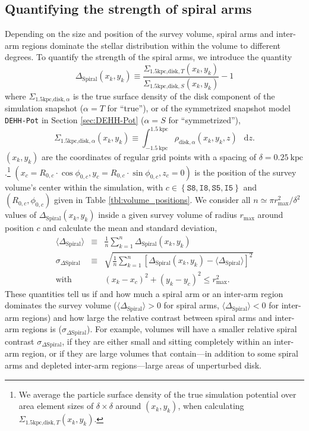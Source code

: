 \documentclass[iop,revtex4,numberedappendix,appendixfloats]{emulateapj}
\newcommand*\diff{\mathop{}\!\mathrm{d}}
\begin{document}
\subsection{Quantifying the strength of spiral arms} \label{sec:spiral_arm_DeltaS}

Depending on the size and position of the survey volume, spiral arms and inter-arm regions dominate the stellar distribution within the volume to different degrees. To quantify the strength of the spiral arms, we introduce the quantity
\begin{equation}
\Delta_\text{Spiral} (x_k,y_k) \equiv \frac{\Sigma_{\text{1.5kpc,disk},T}(x_k,y_k)}{\Sigma_{\text{1.5kpc,disk},S}(x_k,y_k)} -1\label{eq:DeltaS_definition}
\end{equation}
where $\Sigma_{\text{1.5kpc,disk},\alpha}$ is the true surface density of the disk component of the simulation snapshot ($\alpha=T$ for ``true''), or of the symmetrized snapshot model \texttt{DEHH-Pot} in Section \ref{sec:DEHH-Pot} ($\alpha=S$ for ``symmetrized''),
\begin{equation}
\Sigma_{\text{1.5kpc,disk},\alpha}(x_k,y_k) \equiv \int_{-1.5~\text{kpc}}^{1.5~\text{kpc}} \rho_{\text{disk},\alpha}(x_k,y_k,z) \ \diff z.
\end{equation}
$(x_k,y_k)$ are the coordinates of regular grid points with a spacing of $\delta=0.25~\text{kpc}$.\footnote{We average the particle surface density of the true simulation potential over area element sizes of $\delta \times \delta$ around $(x_k,y_k)$, when calculating $\Sigma_{\text{1.5kpc,disk},T}(x_k,y_k)$.} $(x_c=R_{0,c} \cdot \cos \phi_{0,c},y_c=R_{0,c} \cdot \sin \phi_{0,c},z_c=0)$ is the position of the survey volume's center within the simulation, with $c\in\left\{ \texttt{S8},\texttt{I8},\texttt{S5},\texttt{I5}\right\}$ and $(R_{0,c},\phi_{0,c})$ given in Table \ref{tbl:volume_positions}. We consider all $n \simeq \pi r_\text{max}^2/\delta^2$ values of $\Delta_\text{Spiral} (x_k,y_k)$ inside a given survey volume of radius $r_\text{max}$ around position $c$ and calculate the mean and standard deviation,
\begin{eqnarray}
\langle \Delta_\text{Spiral} \rangle &\equiv & \frac 1n \sum_{k=1}^n \Delta_\text{Spiral}(x_k,y_k)\label{eq:mean_DeltaS}\\
\sigma_{\Delta\text{Spiral}} &\equiv & \sqrt{\frac 1n \sum_{k=1}^{n} \left[ \Delta_\text{Spiral}(x_k,y_k) - \langle \Delta_\text{Spiral} \rangle \right]^2}\label{eq:std_DeltaS}\\
 \text{with } && (x_k-x_c)^2 + (y_k-y_c)^2 \leq r_\text{max}^2.
\end{eqnarray}
These quantities tell us if and how much a spiral arm or an inter-arm region dominates the survey volume ($\langle \Delta_\text{Spiral} \rangle > 0$ for spiral arms, $\langle \Delta_\text{Spiral} \rangle < 0$ for inter-arm regions) and how large the relative contrast between spiral arms and inter-arm regions is ($\sigma_{\Delta\text{Spiral}}$). For example, volumes will have a smaller relative spiral contrast $\sigma_{\Delta\text{Spiral}}$, if they are either small and sitting completely within an inter-arm region, or if they are large volumes that contain---in addition to some spiral arms and depleted inter-arm regions---large areas of unperturbed disk.
\end{document}
